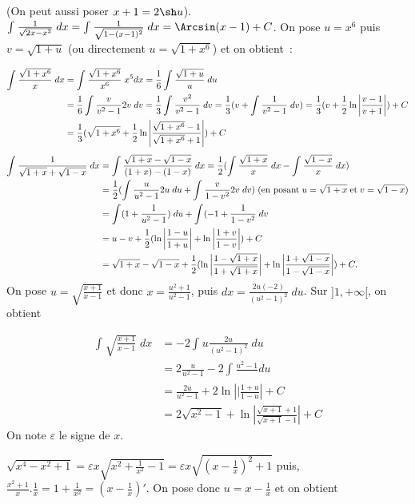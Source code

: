 {{(On peut aussi poser $x+1=2\sh u$).
$\int_{}^{}\frac{1}{\sqrt{2x-x^2}}\;dx=\int_{}^{}\frac{1}{\sqrt{1-(x-1)^2}}\;dx=\Arcsin(x-1)+C$.
On pose $u=x^6$ puis $v=\sqrt{1+u}$ (ou directement $u=\sqrt{1+x^6}$) et on obtient~:

\begin{align*}\ensuremath
\int_{}^{}\frac{\sqrt{1+x^6}}{x}\;dx&=\int_{}^{}\frac{\sqrt{1+x^6}}{x^6}\;x^5dx=\frac{1}{6}\int_{}^{}\frac{\sqrt{1+u}}{u}\;du\\
 &=\frac{1}{6}\int_{}^{}\frac{v}{v^2-1}2v\;dv=\frac{1}{3}\int_{}^{}\frac{v^2}{v^2-1}\;dv=\frac{1}{3}(v+\int_{}^{}\frac{1}{v^2-1}\;dv)
=\frac{1}{3}(v+\frac{1}{2}\ln\left|\frac{v-1}{v+1}\right|)+C\\
 &=\frac{1}{3}(\sqrt{1+x^6}+\frac{1}{2}\ln\left|\frac{\sqrt{1+x^6}-1}{\sqrt{1+x^6}+1}\right|)+C\\
\end{align*}
\begin{align*}\ensuremath
\int_{}^{}\frac{1}{\sqrt{1+x}+\sqrt{1-x}}\;dx&=\int_{}^{}\frac{\sqrt{1+x}-\sqrt{1-x}}{(1+x)-(1-x)}\;dx
=\frac{1}{2}(\int_{}^{}\frac{\sqrt{1+x}}{x}\;dx-\int_{}^{}\frac{\sqrt{1-x}}{x}\;dx)\\
 &=\frac{1}{2}(\int_{}^{}\frac{u}{u^2-1}2u\;du+\int_{}^{}\frac{v}{1-v^2}2v\;dv)\;(\mbox{en posant}\;u=\sqrt{1+x}\;\mbox{et}\;v=\sqrt{1-x})\\
 &=\int_{}^{}(1+\frac{1}{u^2-1})\;du+\int_{}^{}(-1+\frac{1}{1-v^2}\;dv\\
 &=u-v+\frac{1}{2}(\ln\left|\frac{1-u}{1+u}\right|+\ln\left|\frac{1+v}{1-v}\right|)+C\\
 &=\sqrt{1+x}-\sqrt{1-x}+\frac{1}{2}(\ln\left|\frac{1-\sqrt{1+x}}{1+\sqrt{1+x}}\right|+\ln\left|\frac{1+\sqrt{1-x}}{1-\sqrt{1-x}}\right|)+C.
\end{align*}
On pose $u=\sqrt{\frac{x+1}{x-1}}$ et donc $x=\frac{u^2+1}{u^2-1}$, puis $dx=\frac{2u(-2)}{(u^2-1)^2}\;du$. Sur $]1,+\infty[$, on obtient

\begin{align*}
\int_{}^{}\sqrt{\frac{x+1}{x-1}}\;dx&=-2\int_{}^{}u\frac{2u}{(u^2-1)^2}\;du\\
 &=2\frac{u}{u^2-1}-2\int_{}^{}\frac{u^2-1}\;du\\
 &=\frac{2u}{u^2-1}+2\ln\left||\frac{1+u}{1-u}\right|+C\\
 &=2\sqrt{x^2-1}+\ln\left|\frac{\sqrt{x+1}+1}{\sqrt{x+1}-1}\right|+C
\end{align*}
On note $\varepsilon$ le signe de $x$.

$\sqrt{x^4-x^2+1}=\varepsilon x\sqrt{x^2+\frac{1}{x^2}-1}=\varepsilon x\sqrt{(x-\frac{1}{x})^2+1}$ puis, $\frac{x^2+1}{x}.\frac{1}{x}=1+\frac{1}{x^2}=(x-\frac{1}{x})'$. On pose donc $u=x-\frac{1}{x}$ et on obtient

}}
